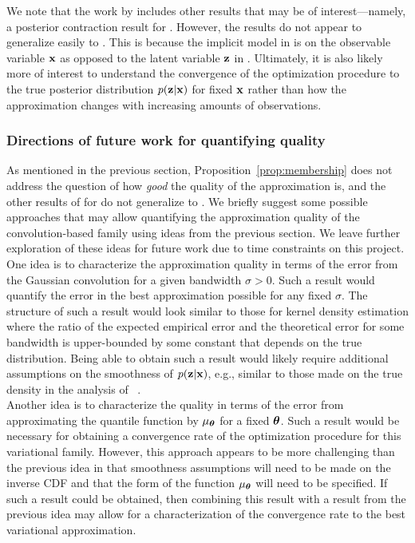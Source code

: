 \documentclass[10pt]{article}
\begin{document}
We note that the work by \citet{Plummer:2021} includes other results that may be of interest---namely, a posterior contraction result for \nllvm. However, the results do not appear to generalize easily to \uivi. This is because the implicit model in \nllvm is on the observable variable $\mathbf{x}$ as opposed to the latent variable $\mathbf{z}$ in \uivi. Ultimately, it is also likely more of interest to understand the convergence of the \uivi optimization procedure to the true posterior distribution $p(\mathbf{z}|\mathbf{x})$ for fixed $\mathbf{x}$ rather than how the approximation changes with increasing amounts of observations.


\subsubsection{Directions of future work for quantifying quality} \label{sec:future:approximation}

As mentioned in the previous section, Proposition~\ref{prop:membership} does not address the question of how \textit{good} the quality of the \uivi approximation is, and the other results of \citet{Plummer:2021} for \nllvm do not generalize to \uivi. We briefly suggest some possible approaches that may allow quantifying the approximation quality of the convolution-based family using ideas from the previous section. We leave further exploration of these ideas for future work due to time constraints on this project.
\\

One idea is to characterize the approximation quality in terms of the error from the Gaussian convolution for a given bandwidth $\sigma>0$. Such a result would quantify the error in the best approximation possible for any fixed $\sigma$. The structure of such a result would look similar to those for kernel density estimation \citep[e.g.,][Section~9.5, Chapter~11]{Devroye:2001} where the ratio of the expected empirical error and the theoretical error for some bandwidth is upper-bounded by some constant that depends on the true distribution. Being able to obtain such a result would likely require additional assumptions on the smoothness of $p(\mathbf{z}|\mathbf{x})$, e.g., similar to those made on the true density in the analysis of \nllvm~\citep{Plummer:2021}.
\\

Another idea is to characterize the quality in terms of the error from approximating the quantile function by $\mu_{\bm{\theta}}$ for a fixed ${\bm{\theta}}$. Such a result would be necessary for obtaining a convergence rate of the \uivi optimization procedure for this variational family. However, this approach appears to be more challenging than the previous idea in that smoothness assumptions will need to be made on the inverse CDF and that the form of the function $\mu_{\bm{\theta}}$ will need to be specified. If such a result could be obtained, then combining this result with a result from the previous idea may allow for a characterization of the convergence rate to the best \uivi variational approximation.
\end{document}
